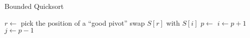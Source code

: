 %
\begin{algorithm}[t]
\caption{Bounded Quicksort}\label{alg:boundedqs}
\begin{algorithmic}[1]
    \State $r \gets$ pick the position of a ``good pivot''
    \State swap $S[r]$ with $S[i]$
    \State $p \gets$ 
      \State {}
      \State $i \gets p + 1$
    \Else
      \State {}
      \State $j \gets p - 1$
    \EndIf
  \EndWhile
  \State {}
\EndProcedure
\end{algorithmic}
\end{algorithm}
